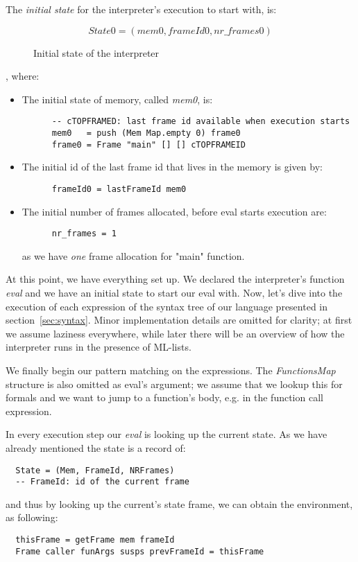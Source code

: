 \documentclass[diploma]{softlab-thesis}
\begin{document}
The \textit{initial state} for the interpreter's execution to start with, is:
\begin{figure}[h]
\[ 
  \mathit{State0 = (mem0, frameId0, nr\_frames0) }
\]
\caption{Initial state of the interpreter\label{fig:state0}}
\end{figure}
, where:
\begin{itemize}
  \item The initial state of memory, called \textit{mem0}, is:
    \begin{verbatim}
      -- cTOPFRAMED: last frame id available when execution starts
      mem0   = push (Mem Map.empty 0) frame0 
      frame0 = Frame "main" [] [] cTOPFRAMEID 
    \end{verbatim}
  \item The initial id of the last frame id that lives in the memory is given by:
    \begin{verbatim}
      frameId0 = lastFrameId mem0
    \end{verbatim}
  \item The initial number of frames allocated, before eval starts execution are:
    \begin{verbatim}
      nr_frames = 1
    \end{verbatim}
  as we have \textit{one} frame allocation for "main" function.
\end{itemize}

At this point, we have everything set up. We declared the interpreter's function \textit{eval} and we have an initial 
state to start our eval with. Now, let's dive into the execution of each expression of the syntax tree of our language 
presented in section~\ref{sec:syntax}. Minor implementation details are omitted for clarity; at first we assume laziness everywhere, 
while later there will be an overview of how the interpreter runs in the presence of ML-lists.

We finally begin our pattern matching on the expressions. The \textit{FunctionsMap} structure is also omitted as 
eval's argument; we assume that we lookup this for formals and we want to jump to a function's body, e.g. in the function  
call expression.

In every execution step our \textit{eval} is looking up the current state. As we have already mentioned the state is 
a record of:
\begin{verbatim}
  State = (Mem, FrameId, NRFrames) 
  -- FrameId: id of the current frame
\end{verbatim}
and thus by looking up the current's state frame, we can obtain the environment, as following:
\begin{verbatim}
  thisFrame = getFrame mem frameId 
  Frame caller funArgs susps prevFrameId = thisFrame 
\end{verbatim}
\end{document}
